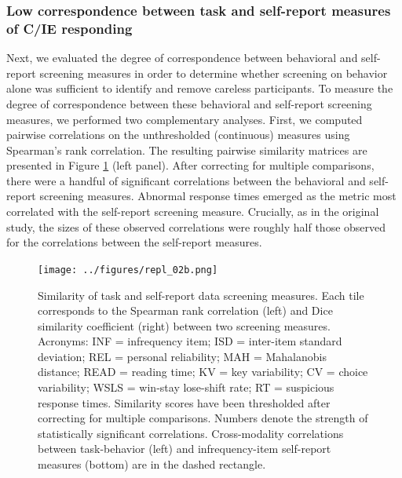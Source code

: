 \documentclass[a4paper,notitlepage,12pt]{article}
\begin{document}
\begin{refsection}[supp]
\subsubsection*{Low correspondence between task and self-report measures of C/IE responding}

Next, we evaluated the degree of correspondence between behavioral and self-report screening measures in order to determine whether screening on behavior alone was sufficient to identify and remove careless participants. To measure the degree of correspondence between these behavioral and self-report screening measures, we performed two complementary analyses. First, we computed pairwise correlations on the unthresholded (continuous) measures using Spearman's rank correlation. The resulting pairwise similarity matrices are presented in Figure \ref{fig:repl_correspondence} (left panel). After correcting for multiple comparisons, there were a handful of significant correlations between the behavioral and self-report screening measures. Abnormal response times emerged as the metric most correlated with the self-report screening measure. Crucially, as in the original study, the sizes of these observed correlations were roughly half those observed for the correlations between the self-report measures. 

\begin{figure}[!t]
\texttt{[image: ../figures/repl\_02b.png]}
\centering
\captionsetup{width=0.88\textwidth}
\caption{Similarity of task and self-report data screening measures. Each tile corresponds to the Spearman rank correlation (left) and Dice similarity coefficient (right) between two screening measures. Acronyms: INF = infrequency item; ISD = inter-item standard deviation; REL = personal reliability; MAH = Mahalanobis distance; READ = reading time; KV = key variability; CV = choice variability; WSLS = win-stay lose-shift rate; RT = suspicious response times. Similarity scores have been thresholded after correcting for multiple comparisons. Numbers denote the strength of statistically significant correlations. Cross-modality correlations between task-behavior (left) and infrequency-item self-report measures (bottom) are in the dashed rectangle.}
\label{fig:repl_correspondence}
\end{figure}


\end{refsection}
\end{document}
